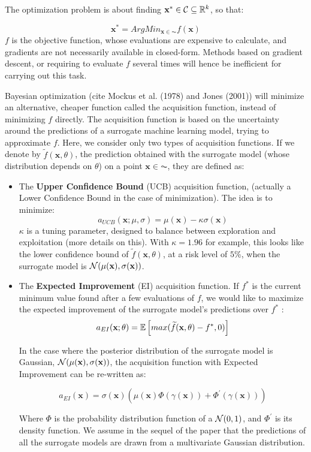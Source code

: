 The optimization problem is about finding $\textbf{x}^* \in \mathcal{C} \subseteq \mathbb{R}^k$, so that: 

$$
\textbf{x}^* = ArgMin_{\textbf{x} \in \AC} f(\textbf{x})
$$
$f$ is the objective function, whose evaluations are expensive to calculate, and gradients are not necessarily available in closed-form. Methods based on gradient descent, or requiring to evaluate $f$ several times will hence be inefficient for carrying out this task. 

\medskip

Bayesian optimization (cite Mockus et al. (1978) and Jones (2001)) will minimize an alternative, cheaper function called the acquisition function, instead of minimizing $f$ directly. The acquisition function is based on the uncertainty around the predictions of a surrogate machine learning model, trying to approximate $f$. Here, we consider only two types of acquisition functions. If we denote by $\widetilde{f}(\textbf{x}, \theta)$, the prediction obtained with the surrogate model (whose distribution depends on $\theta$) on a point $\textbf{x} \in \AC$, they are defined as: 

\begin{itemize}
\item The \textbf{Upper Confidence Bound} (UCB) acquisition function, (actually a Lower Confidence Bound in the case of minimization). The idea is to minimize: 
$$
a_{UCB}(\textbf{x}; \mu, \sigma) = \mu(\textbf{x}) - \kappa \sigma(\textbf{x})
$$
$\kappa$ is a tuning parameter, designed to balance between exploration and exploitation (more details on this). With $\kappa = 1.96$ for example, this looks like the lower confidence bound of $\widetilde{f}(\textbf{x}, \theta)$, at a risk level of $5$\%, when the surrogate model is $\mathcal{N}(\mu(\textbf{x}), \sigma(\textbf{x}))$. 

\medskip

\item The \textbf{Expected Improvement} (EI) acquisition function. If $f^*$ is the current minimum value found after a few evaluations of $f$, we would like to maximize the expected improvement of the surrogate model's predictions over $f^*$ :  
$$
a_{EI}(\textbf{x}; \theta) = \mathbb{E} \left[ max(\widetilde{f}(\textbf{x}, \theta) - f^*, 0)\right]
$$

In the case where the posterior distribution of the surrogate model is Gaussian, $\mathcal{N}(\mu(\textbf{x}), \sigma(\textbf{x}))$, the acquisition function with  Expected Improvement can be re-written as: 

$$
a_{EI}(\textbf{x}) = \sigma(\textbf{x}) \left( \mu(\textbf{x}) \Phi \left( \gamma(\textbf{x}) \right) +  \Phi^{'} \left( \gamma(\textbf{x}) \right) \right)
$$

\medskip

Where $\Phi$ is the probability distribution function of a $\mathcal{N}(0, 1)$, and $\Phi^{'}$ is its density function. We assume in the sequel of the paper that the  predictions of all the surrogate models are drawn from a multivariate Gaussian distribution.

\end{itemize}

